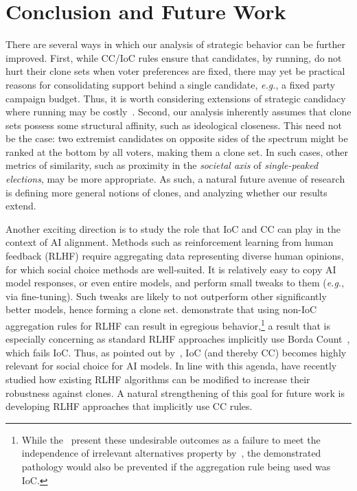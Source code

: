 \section{Conclusion and Future Work}\label{sec:disc}

There are several ways in which our analysis of strategic behavior can be further improved. First, while CC/IoC rules ensure that candidates, by running, do not hurt their clone sets when voter preferences are fixed, there may yet be practical reasons for consolidating support behind a single candidate, \emph{e.g.}, a fixed party campaign budget. Thus, it is worth considering extensions of strategic candidacy where running may be costly~\citep{Obraztsova15:Strategic}. Second, our analysis inherently assumes that clone sets possess some structural affinity, such as ideological closeness. This need not be the case: two extremist candidates on opposite sides of the spectrum might be ranked at the bottom by all voters, making them a clone set. In such cases, other metrics of similarity, such as proximity in the \emph{societal axis} of \emph{single-peaked elections}, may be more appropriate. As such, a natural future avenue of research is defining more general notions of clones, and analyzing whether our results extend.


Another exciting direction is to study the role that IoC and CC can play in the context of AI alignment. Methods such as reinforcement learning from human feedback (RLHF) require aggregating data representing diverse human opinions, for which social choice methods are well-suited. It is relatively easy to copy AI model responses, or even entire models, and perform small tweaks to them (\emph{e.g.}, via fine-tuning). Such tweaks are likely to not outperform other significantly better models, hence forming a clone set. \citet{Xu24:RLHF} demonstrate that using non-IoC aggregation rules for RLHF can result in egregious behavior,\footnote{While the~\citet{Xu24:RLHF} present these undesirable outcomes as a failure to meet the independence of irrelevant alternatives property by~\citet{Luce59:Individual}, the demonstrated pathology would also be prevented if the aggregation rule being used was IoC.} a result that is especially concerning as standard RLHF approaches implicitly use Borda Count~\citep{Siththaranjan24:Distributional}, which fails IoC. Thus, as pointed out by~\citet{Conitzer24:Position}, IoC (and thereby CC) becomes highly relevant for social choice for AI models. In line with this agenda, \citet{Procaccia25:Clone} have recently studied how existing RLHF algorithms can be modified to increase their robustness against clones. A natural strengthening of this goal for future work is developing RLHF approaches that implicitly use CC rules.
  

  





